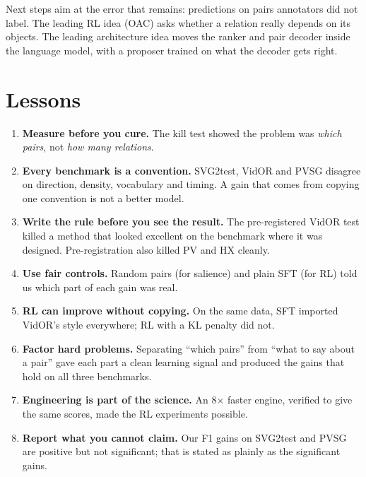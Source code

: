 \documentclass[11pt,openany]{book}
\begin{document}
\begin{summarybox}
Next steps aim at the error that remains: predictions on pairs annotators did not label. The leading RL idea (OAC) asks whether a
relation really depends on its objects. The leading architecture idea moves the ranker and pair decoder inside the language model,
with a proposer trained on what the decoder gets right.
\end{summarybox}

\chapter{Lessons}\label{ch:lessons}

\begin{enumerate}
  \item \textbf{Measure before you cure.} The kill test showed the problem was \emph{which pairs}, not \emph{how many relations}.
  \item \textbf{Every benchmark is a convention.} SVG2test, VidOR and PVSG disagree on direction, density, vocabulary and timing. A
  gain that comes from copying one convention is not a better model.
  \item \textbf{Write the rule before you see the result.} The pre-registered VidOR test killed a method that looked excellent on the
  benchmark where it was designed. Pre-registration also killed PV and HX cleanly.
  \item \textbf{Use fair controls.} Random pairs (for salience) and plain SFT (for RL) told us which part of each gain was real.
  \item \textbf{RL can improve without copying.} On the same data, SFT imported VidOR's style everywhere; RL with a KL penalty did not.
  \item \textbf{Factor hard problems.} Separating ``which pairs'' from ``what to say about a pair'' gave each part a clean learning
  signal and produced the gains that hold on all three benchmarks.
  \item \textbf{Engineering is part of the science.} An 8$\times$ faster engine, verified to give the same scores, made the RL
  experiments possible.
  \item \textbf{Report what you cannot claim.} Our F1 gains on SVG2test and PVSG are positive but not significant; that is stated as
  plainly as the significant gains.
\end{enumerate}
\end{document}
